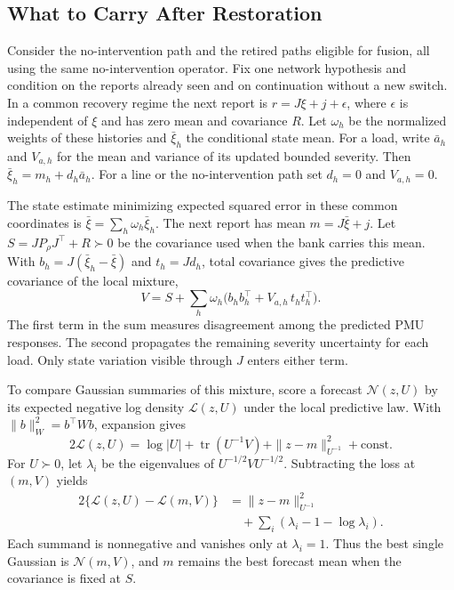 \subsection{What to Carry After Restoration}
\label{sec:recovery-moments}

Consider the no-intervention path and the retired paths eligible for
fusion, all using the same no-intervention operator. Fix one network hypothesis and condition
on the reports already seen and on continuation without a new switch. In a
common recovery regime the next report is $r=J\xi+j+\epsilon$, where
$\epsilon$ is independent of $\xi$ and has zero mean and covariance $R$.
Let $\omega_h$ be the normalized weights of these histories and
$\bar\xi_h$ the conditional state mean. For a load, write $\bar a_h$ and
$V_{a,h}$ for the mean and variance of its updated bounded severity.
Then $\bar\xi_h=m_h+d_h\bar a_h$. For a line or the no-intervention path set $d_h=0$ and $V_{a,h}=0$.

The state estimate minimizing expected squared error in these common
coordinates is $\bar\xi=\sum_h\omega_h\bar\xi_h$. The next report has
mean $m=J\bar\xi+j$. Let $S=JP_\rho J^\top+R\succ0$ be the covariance
used when the bank carries this mean. With
$b_h=J(\bar\xi_h-\bar\xi)$ and $t_h=Jd_h$, total covariance gives the
predictive covariance of the local mixture,
\begin{equation}
 V=S+\sum_h\omega_h\bigl(b_hb_h^\top+
                    V_{a,h}\,t_ht_h^\top\bigr).
 \label{eq:recovery-report-variance}
\end{equation}
The first term in the sum measures disagreement among the predicted PMU
responses. The second propagates the remaining severity uncertainty for
each load. Only state variation visible through $J$ enters either term.

To compare Gaussian summaries of this mixture, score a forecast
$\mathcal N(z,U)$ by its expected negative log density $\mathcal L(z,U)$
under the local predictive law. With $\|b\|_W^2=b^\top Wb$, expansion gives
\begin{equation}
 2\mathcal L(z,U)=\log|U|+\operatorname{tr}(U^{-1}V)
                      +\|z-m\|_{U^{-1}}^2+\mathrm{const}.
 \label{eq:recovery-log-loss}
\end{equation}
For $U\succ0$, let $\lambda_i$ be the eigenvalues of
$U^{-1/2}VU^{-1/2}$. Subtracting the loss at $(m,V)$ yields
\begin{align}
 2\{\mathcal L(z,U)-\mathcal L(m,V)\}
 &=\|z-m\|_{U^{-1}}^2 \nonumber\\
 &\quad+\sum_i(\lambda_i-1-\log\lambda_i).
 \label{eq:recovery-log-projection}
\end{align}
Each summand is nonnegative and vanishes only at $\lambda_i=1$. Thus the
best single Gaussian is $\mathcal N(m,V)$, and $m$ remains the best
forecast mean when the covariance is fixed at $S$.

